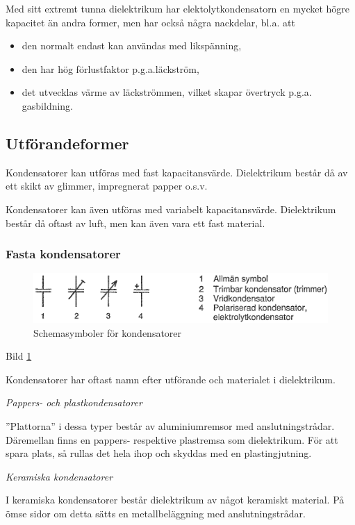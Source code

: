 Med sitt extremt tunna dielektrikum har elektolytkondensatorn en mycket högre
kapacitet än andra former, men har också några nackdelar, bl.a. att
\begin{itemize}
  \item den normalt endast kan användas med likspänning,
  \item den har hög förlustfaktor p.g.a.läckström,
  \item det utvecklas värme av läckströmmen, vilket skapar övertryck p.g.a.
    gasbildning.
\end{itemize}


\subsection{Utförandeformer}

Kondensatorer kan utföras med fast kapacitansvärde. Dielektrikum består då av
ett skikt av glimmer, impregnerat papper o.s.v.

Kondensatorer kan även utföras med variabelt kapacitansvärde. Dielektrikum
består då oftast av luft, men kan även vara ett fast material.

\subsubsection{Fasta kondensatorer}

\begin{figure}[h]
\includegraphics[width=\textwidth]{images/cropped_pdfs/bild_2_2-02.pdf}
\caption{Schemasymboler för kondensatorer}
\label{fig:BildII2-2}
\end{figure}

Bild \ref{fig:BildII2-2}

Kondensatorer har oftast namn efter utförande och materialet i dielektrikum.

\emph{Pappers- och plastkondensatorer}

''Plattorna'' i dessa typer består av aluminiumremsor med anslutningstrådar.
Däremellan finns en pappers- respektive plastremsa som dielektrikum. För att
spara plats, så rullas det hela ihop och skyddas med en plastingjutning.

\emph{Keramiska kondensatorer}

I keramiska kondensatorer består dielektrikum av något keramiskt material. På
ömse sidor om detta sätts en metallbeläggning med anslutningstrådar.


